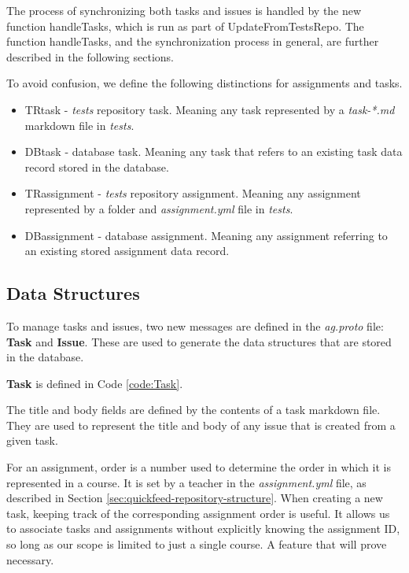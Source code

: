 The process of synchronizing both tasks and issues is handled by the new function handleTasks, which is run as part of UpdateFromTestsRepo.
The function handleTasks, and the synchronization process in general, are further described in the following sections. 

To avoid confusion, we define the following distinctions for assignments and tasks.
\begin{itemize}
    \item TRtask - \textit{tests} repository task. Meaning any task represented by a \textit{task-*.md} markdown file in \textit{tests}.
    \item DBtask - database task. Meaning any task that refers to an existing task data record stored in the database.
    \item TRassignment - \textit{tests} repository assignment. Meaning any assignment represented by a folder and \textit{assignment.yml} file
    in \textit{tests}. 
    \item DBassignment - database assignment. Meaning any assignment referring to an existing stored assignment data record.
\end{itemize}

\subsection{Data Structures}
\label{sec:tasks-and-issues-data-structures}

To manage tasks and issues, two new messages are defined in the \textit{ag.proto} file: \textbf{Task} and \textbf{Issue}.
These are used to generate the data structures that are stored in the database.

\textbf{Task} is defined in Code \ref{code:Task}.



The title and body fields are defined by the contents of a task markdown file.
They are used to represent the title and body of any issue that is created from a given task.

For an assignment, order is a number used to determine the order in which it is represented in a course.
It is set by a teacher in the \textit{assignment.yml} file, as described in Section \ref{sec:quickfeed-repository-structure}.
When creating a new task, keeping track of the corresponding assignment order is useful.
It allows us to associate tasks and assignments without explicitly knowing the assignment ID, so long as our scope is limited to just a single course.
A feature that will prove necessary.

